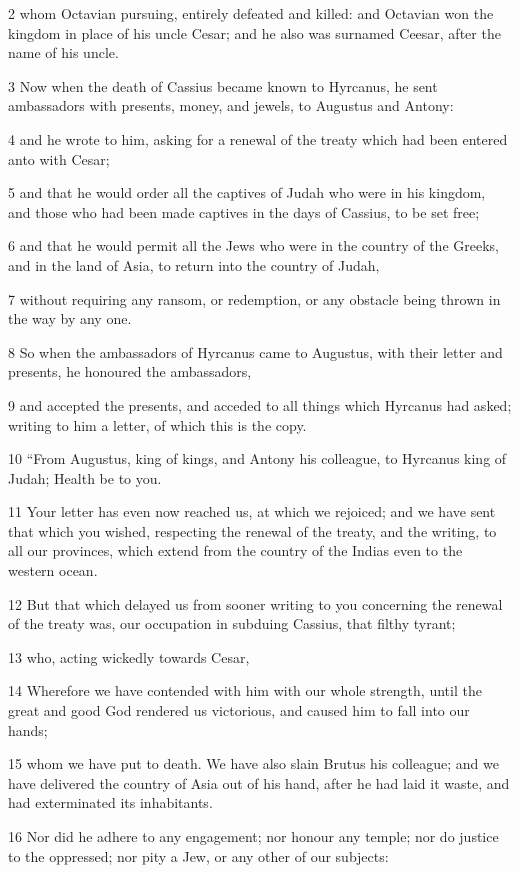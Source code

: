 2 whom Octavian pursuing, entirely defeated and killed: and Octavian won the kingdom in place of his uncle Cesar; and he also was surnamed Ceesar, after the name of his uncle. 

3 Now when the death of Cassius became known to Hyrcanus, he sent ambassadors with presents, money, and jewels, to Augustus and Antony: 

4 and he wrote to him, asking for a renewal of the treaty which had been entered anto with Cesar; 

5 and that he would order all the captives of Judah who were in his kingdom, and those who had been made captives in the days of Cassius, to be set free; 

6 and that he would permit all the Jews who were in the country of the Greeks, and in the land of Asia, to return into the country of Judah, 

7 without requiring any ransom, or redemption, or any obstacle being thrown in the way by any one. 

8 So when the ambassadors of Hyrcanus came to Augustus, with their letter and presents, he honoured the ambassadors, 

9 and accepted the presents, and acceded to all things which Hyrcanus had asked; writing to him a letter, of which this is the copy. 

10 “From Augustus, king of kings, and Antony his colleague, to Hyrcanus king of Judah; Health be to you. 

11 Your letter has even now reached us, at which we rejoiced; and we have sent that which you wished, respecting the renewal of the treaty, and the writing, to all our provinces, which extend from the country of the Indias even to the western ocean. 

12 But that which delayed us from sooner writing to you concerning the renewal of the treaty was, our occupation in subduing Cassius, that filthy tyrant; 

13 who, acting wickedly towards Cesar, 

14 Wherefore we have contended with him with our whole strength, until the great and good God rendered us victorious, and caused him to fall into our hands; 

15 whom we have put to death. We have also slain Brutus his colleague; and we have delivered the country of Asia out of his hand, after he had laid it waste, and had exterminated its inhabitants. 

16 Nor did he adhere to any engagement; nor honour any temple; nor do justice to the oppressed; nor pity a Jew, or any other of our subjects: 


